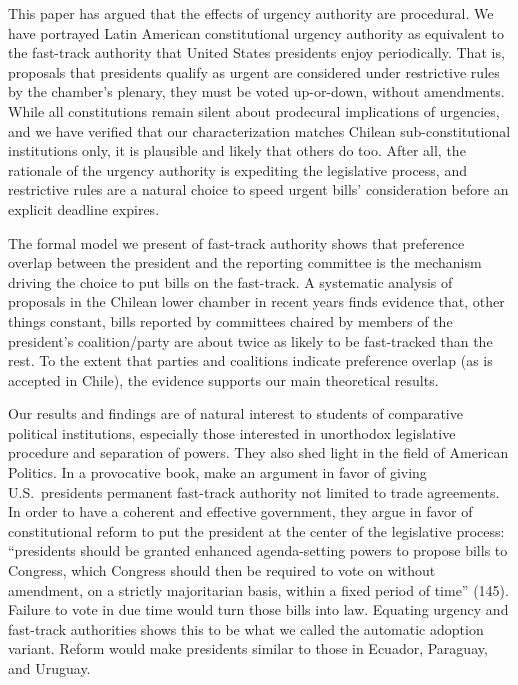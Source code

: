 \documentclass[letter,12pt]{article}
\begin{document}
This paper has argued that the effects of urgency authority are procedural. We have portrayed Latin American constitutional urgency authority as equivalent to the fast-track authority that United States presidents enjoy periodically. That is, proposals that presidents qualify as urgent are considered under restrictive rules by the chamber's plenary, they must be voted up-or-down, without amendments. While all constitutions remain silent about prodecural implications of urgencies, and we have verified that our characterization matches Chilean sub-constitutional institutions only, it is plausible and likely that others do too. After all, the rationale of the urgency authority is expediting the legislative process, and restrictive rules are a natural choice to speed urgent bills' consideration before an explicit deadline expires. 

The formal model we present of fast-track authority shows that preference overlap between the president and the reporting committee is the mechanism driving the choice to put bills on the fast-track. A systematic analysis of proposals in the Chilean lower chamber in recent years finds evidence that, other things constant, bills reported by committees chaired by members of the president's coalition/party are about twice as likely to be fast-tracked than the rest. To the extent that parties and coalitions indicate preference overlap (as is accepted in Chile), the evidence supports our main theoretical results.

Our results and findings are of natural interest to students of comparative political institutions, especially those interested in unorthodox legislative procedure and separation of powers. They also shed light in the field of American Politics. In a provocative book, \citet{howell.moe.Relic2016} make an argument in favor of giving U.S.\ presidents permanent fast-track authority not limited to trade agreements. In order to have a coherent and effective government, they argue in favor of constitutional reform to put the president at the center of the legislative process: ``presidents should be granted enhanced agenda-setting powers to propose bills to Congress, which Congress should then be required to vote on without amendment, on a strictly majoritarian basis, within a fixed period of time'' (145). Failure to vote in due time would turn those bills into law. Equating urgency and fast-track authorities shows this to be what we called the automatic adoption variant. Reform would make presidents similar to those in Ecuador, Paraguay, and Uruguay. 
\end{document}
